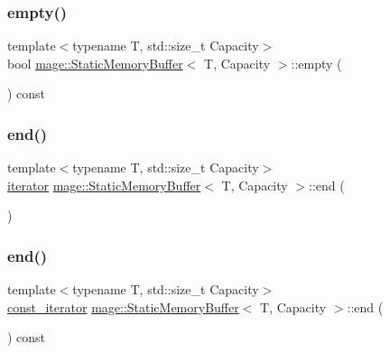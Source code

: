 \subsubsection{\texorpdfstring{empty()}{empty()}}
{\footnotesize\ttfamily template$<$typename T, std\+::size\+\_\+t Capacity$>$ \\
bool \mbox{\hyperlink{classmage_1_1_static_memory_buffer}{mage\+::\+Static\+Memory\+Buffer}}$<$ T, Capacity $>$\+::empty (\begin{DoxyParamCaption}{ }\end{DoxyParamCaption}) const\hspace{0.3cm}{\ttfamily [noexcept]}}

\mbox{\label{classmage_1_1_static_memory_buffer_a9e079aa361e730c99be72883382b9e3d}} 
\subsubsection{\texorpdfstring{end()}{end()}\hspace{0.1cm}{\footnotesize\ttfamily [1/2]}}
{\footnotesize\ttfamily template$<$typename T, std\+::size\+\_\+t Capacity$>$ \\
\mbox{\hyperlink{classmage_1_1_static_memory_buffer_abeee1c933cd54117e1a92de4a1cc698f}{iterator}} \mbox{\hyperlink{classmage_1_1_static_memory_buffer}{mage\+::\+Static\+Memory\+Buffer}}$<$ T, Capacity $>$\+::end (\begin{DoxyParamCaption}{ }\end{DoxyParamCaption})\hspace{0.3cm}{\ttfamily [noexcept]}}

\mbox{\label{classmage_1_1_static_memory_buffer_ad5205cd7ff5d458f23d13cbca7d05614}} 
\subsubsection{\texorpdfstring{end()}{end()}\hspace{0.1cm}{\footnotesize\ttfamily [2/2]}}
{\footnotesize\ttfamily template$<$typename T, std\+::size\+\_\+t Capacity$>$ \\
\mbox{\hyperlink{classmage_1_1_static_memory_buffer_aa871d2967d2e9f4219ab47c16563e328}{const\+\_\+iterator}} \mbox{\hyperlink{classmage_1_1_static_memory_buffer}{mage\+::\+Static\+Memory\+Buffer}}$<$ T, Capacity $>$\+::end (\begin{DoxyParamCaption}{ }\end{DoxyParamCaption}) const\hspace{0.3cm}{\ttfamily [noexcept]}}

